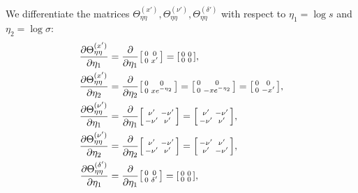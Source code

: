 \documentclass{article}
\begin{document}
We differentiate the matrices $\Theta_{\eta\eta}^{(x')}, \Theta_{\eta\eta}^{(\nu')}, \Theta_{\eta\eta}^{(\delta')}$ with respect to $\eta_1 = \log s$ and $\eta_2 = \log \sigma$:
%
\begin{align}
  \frac{\partial \Theta_{\eta\eta}^{(x')}}{\partial \eta_1}      & = \frac{\partial}{\partial \eta_1} \begin{bsmallmatrix} 0 & 0 \\ 0 & x' \end{bsmallmatrix} = \begin{bsmallmatrix} 0 & 0 \\ 0 & 0 \end{bsmallmatrix},                                   \\
  \frac{\partial \Theta_{\eta\eta}^{(x')}}{\partial \eta_2}      & = \frac{\partial}{\partial \eta_2} \begin{bsmallmatrix} 0 & 0 \\ 0 & x e^{-\eta_2} \end{bsmallmatrix} = \begin{bsmallmatrix} 0 & 0 \\ 0 & -x e^{-\eta_2} \end{bsmallmatrix} = \begin{bsmallmatrix} 0 & 0 \\ 0 & -x' \end{bsmallmatrix}, \\
  \frac{\partial \Theta_{\eta\eta}^{(\nu')}}{\partial \eta_1}    & = \frac{\partial}{\partial \eta_1} \begin{bsmallmatrix} \nu' & -\nu' \\ -\nu' & \nu' \end{bsmallmatrix} = \begin{bsmallmatrix} \nu' & -\nu' \\ -\nu' & \nu' \end{bsmallmatrix},                                   \\
  \frac{\partial \Theta_{\eta\eta}^{(\nu')}}{\partial \eta_2}    & = \frac{\partial}{\partial \eta_2} \begin{bsmallmatrix} \nu' & -\nu' \\ -\nu' & \nu' \end{bsmallmatrix} = \begin{bsmallmatrix} -\nu' & \nu' \\ \nu' & -\nu' \end{bsmallmatrix},                                   \\
  \frac{\partial \Theta_{\eta\eta}^{(\delta')}}{\partial \eta_1} & = \frac{\partial}{\partial \eta_1} \begin{bsmallmatrix} 0 & 0 \\ 0 & \delta' \end{bsmallmatrix} = \begin{bsmallmatrix} 0 & 0 \\ 0 & 0 \end{bsmallmatrix},                                   \\

\end{align}
\end{document}
